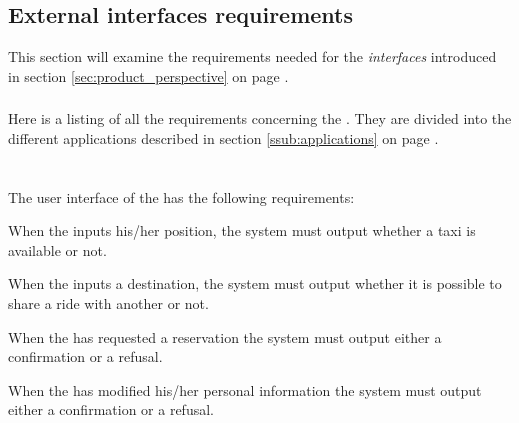 
\subsection{External interfaces requirements} %
\label{sec:External Interfaces}

This section will examine the requirements needed for the \emph{interfaces} introduced in section \ref{sec:product_perspective} on page \pageref{sec:product_perspective}.



\subsubsection{} %
Here is a listing of all the requirements concerning the . They are divided into the different applications described in section \ref{ssub:applications} on page \pageref{ssub:applications}.

\paragraph{} \hfill \\
The user interface of the  has the following requirements:

\begin{enumerate} [label = \textbf{[IR\arabic*]}]

\item When the \emph{} inputs his/her position, the system must output whether a taxi is available or not.

\item When the \emph{} inputs a destination, the system must output whether it is possible to share a ride with another \emph{} or not.

\item When the \emph{} has requested a reservation the system must output either a confirmation or a refusal.

\item When the \emph{} has modified his/her personal information the system must output either a confirmation or a refusal.



\end{enumerate} 

